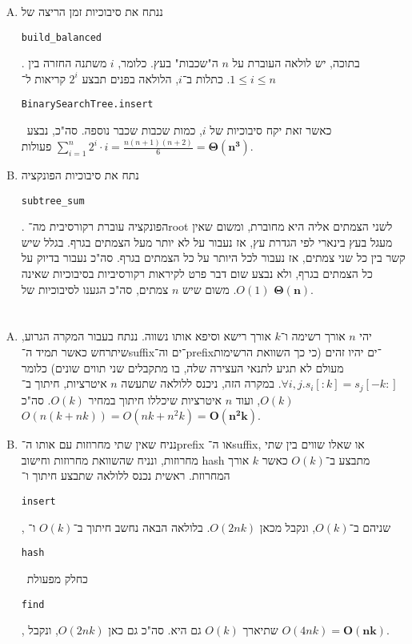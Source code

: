 \documentclass[]{article}
\makeatletter
\newcommand\en[1] {\begin{otherlanguage}{english}#1\end{otherlanguage}}
\newcommand\ttt[1]{\en{\footnotesize\texttt{#1}\normalsize}}
\newcommand{\skipitems}[1]{
	\addtocounter{\@enumctr}{#1}
}
\makeatother
\begin{document}
\begin{enumerate}[A.]
		
		
		\item ננתח את סיבוכיות זמן הריצה של \ttt{build\_balanced}. בתוכה, יש לולאה העוברת על $n$ ה"שכבות" בעץ. כלומר, $i$ משתנה החזרה בין $1 \le i \le n$. כתלות ב־$i$, הלולאה בפנים תבצע $2^i$ קריאות ל־\ttt{BinarySearchTree.insert} \ כאשר זאת יקח סיבוכיות של $i$, כמות שכבות שכבר נוספה. סה"כ, נבצע $\sum_{i = 1}^{n}2^i \cdot i = \frac{n(n + 1)(n + 2)}{6} = \bm{\Theta(n^3)}$ פעולות. 
		\item נתח את סיבוכיות הפונקציה \ttt{subtree\_sum}. הפונקציה עוברת רקורסיבית מה־root לשני הצמתים אליה היא מחוברת, ומשום שאין מעגל בעץ בינארי לפי הגדרת עץ, אז נעבור על לא יותר מעל הצמתים בגרף. בגלל שיש קשר בין כל שני צמתים, אז נעבור לכל היותר על כל הצמתים בגרף. סה"כ נעבור בדיוק על כל הצמתים בגרף, ולא נבצע שום דבר פרט לקיראות רקורסיביות בסיבוכיות שאינה $O(1)$. משום שיש $n$ צמתים, סה"כ הגענו לסיבוכיות של $\bm{\Theta(n)}$. 
	\end{enumerate}
	\section{}
	\begin{enumerate}[A.]
		\skipitems{1}
		\item יהי $n$ אורך רשימה ו־$k$ אורך רישא וסיפא אותו נשווה. ננתח בעבור המקרה הגרוע, שיתרחש כאשר תמיד ה־suffix־ים וה־prefix־ים יהיו זהים (כי כך השוואת הרשימות מעולם לא תגיע לתנאי העצירה שלה, בו מתקבלים שני תווים שונים) כלומר $\forall i, j. s_i[:k] = s_j[-k:]$. במקרה הזה, ניכנס ללולאה שתעשה $n$ איטרציות, חיתוך ב־$O(k)$, ועוד $n$ איטרציות שיכללו חיתוך במחיר $O(k)$. סה"כ $O(n(k + nk)) = O(nk + n^2k) = \bm{O(n^2k)}$. 
		\skipitems{1}
		\item נניח שאין שתי מחרוזות עם אותו ה־prefix או ה־suffix, או שאלו שווים בין שתי מחרוזות, ונניח שהשוואת מחרוזות וחישוב hash מתבצע ב־$O(k)$ כאשר $k$ אורך המחרוזת. ראשית נכנס ללולאה שתבצע חיתוך ו־\ttt{insert}, שניהם ב־$O(k)$, ונקבל מכאן $O(2nk)$. בלולאה הבאה נחשב חיתוך ב־$O(k)$ ו־\ttt{hash} \ כחלק מפעולת \ttt{find}, שתיארך $O(k)$ גם היא. סה"כ גם כאן $O(2nk)$, ונקבל $O(4nk) = \bm{O(nk)}$. 
	\end{enumerate}
\end{document}
